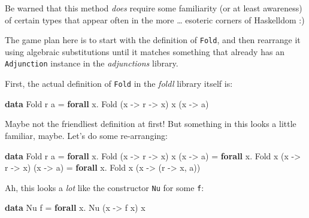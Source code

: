 \documentclass[]{article}
\newenvironment{Shaded}{}{}
\newcommand{\DataTypeTok}[1]{\textcolor[rgb]{0.56,0.13,0.00}{#1}}
\newcommand{\KeywordTok}[1]{\textcolor[rgb]{0.00,0.44,0.13}{\textbf{#1}}}
\newcommand{\NormalTok}[1]{#1}
\newcommand{\OperatorTok}[1]{\textcolor[rgb]{0.40,0.40,0.40}{#1}}
\newcommand{\OtherTok}[1]{\textcolor[rgb]{0.00,0.44,0.13}{#1}}
\begin{document}
Be warned that this method \emph{does} require some familiarity (or at least
awareness) of certain types that appear often in the more \ldots{} esoteric
corners of Haskelldom :)

The game plan here is to start with the definition of \texttt{Fold}, and then
rearrange it using algebraic substitutions until it matches something that
already has an \texttt{Adjunction} instance in the \emph{adjunctions} library.

First, the actual definition of \texttt{Fold} in the \emph{foldl} library itself
is:

\begin{Shaded}
\begin{Highlighting}[]
\KeywordTok{data} \DataTypeTok{Fold}\NormalTok{ r a }\OtherTok{=} \KeywordTok{forall}\NormalTok{ x}\OperatorTok{.} \DataTypeTok{Fold}\NormalTok{ (x }\OtherTok{{-}>}\NormalTok{ r }\OtherTok{{-}>}\NormalTok{ x) x (x }\OtherTok{{-}>}\NormalTok{ a)}
\end{Highlighting}
\end{Shaded}

Maybe not the friendliest definition at first! But something in this looks a
little familiar, maybe. Let's do some re-arranging:

\begin{Shaded}
\begin{Highlighting}[]
\KeywordTok{data} \DataTypeTok{Fold}\NormalTok{ r a }\OtherTok{=} \KeywordTok{forall}\NormalTok{ x}\OperatorTok{.} \DataTypeTok{Fold}\NormalTok{ (x }\OtherTok{{-}>}\NormalTok{ r }\OtherTok{{-}>}\NormalTok{ x) x (x }\OtherTok{{-}>}\NormalTok{ a)}
              \OtherTok{=} \KeywordTok{forall}\NormalTok{ x}\OperatorTok{.} \DataTypeTok{Fold}\NormalTok{ x (x }\OtherTok{{-}>}\NormalTok{ r }\OtherTok{{-}>}\NormalTok{ x) (x }\OtherTok{{-}>}\NormalTok{ a)}
              \OtherTok{=} \KeywordTok{forall}\NormalTok{ x}\OperatorTok{.} \DataTypeTok{Fold}\NormalTok{ x (x }\OtherTok{{-}>}\NormalTok{ (r }\OtherTok{{-}>}\NormalTok{ x, a))}
\end{Highlighting}
\end{Shaded}

Ah, this looks a \emph{lot} like the constructor \texttt{Nu} for some
\texttt{f}:

\begin{Shaded}
\begin{Highlighting}[]
\KeywordTok{data} \DataTypeTok{Nu}\NormalTok{ f }\OtherTok{=} \KeywordTok{forall}\NormalTok{ x}\OperatorTok{.} \DataTypeTok{Nu}\NormalTok{ (x }\OtherTok{{-}>}\NormalTok{ f x) x}
\end{Highlighting}
\end{Shaded}
\end{document}
